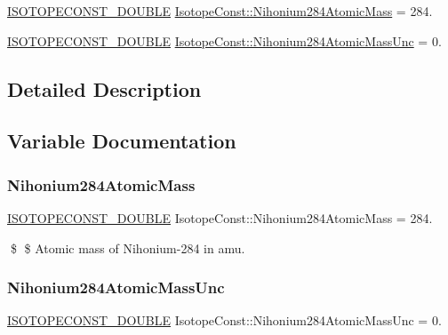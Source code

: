 \begin{DoxyCompactItemize}
\item 
\mbox{\hyperlink{group___isotope_const-_macros_ga8f45a7272ce02c0b4c65c44636ed719a}{I\+S\+O\+T\+O\+P\+E\+C\+O\+N\+S\+T\+\_\+\+D\+O\+U\+B\+LE}} \mbox{\hyperlink{group___isotope_const-_nihonium-_nh284_ga162a0dd06ec54ac38661277358108569}{Isotope\+Const\+::\+Nihonium284\+Atomic\+Mass}} = 284.
\item 
\mbox{\hyperlink{group___isotope_const-_macros_ga8f45a7272ce02c0b4c65c44636ed719a}{I\+S\+O\+T\+O\+P\+E\+C\+O\+N\+S\+T\+\_\+\+D\+O\+U\+B\+LE}} \mbox{\hyperlink{group___isotope_const-_nihonium-_nh284_ga266c70aab092342abc6ea2e861d735f2}{Isotope\+Const\+::\+Nihonium284\+Atomic\+Mass\+Unc}} = 0.
\end{DoxyCompactItemize}


\subsection{Detailed Description}


\subsection{Variable Documentation}
\mbox{\label{group___isotope_const-_nihonium-_nh284_ga162a0dd06ec54ac38661277358108569}} 
\subsubsection{\texorpdfstring{Nihonium284\+Atomic\+Mass}{Nihonium284AtomicMass}}
{\footnotesize\ttfamily \mbox{\hyperlink{group___isotope_const-_macros_ga8f45a7272ce02c0b4c65c44636ed719a}{I\+S\+O\+T\+O\+P\+E\+C\+O\+N\+S\+T\+\_\+\+D\+O\+U\+B\+LE}} Isotope\+Const\+::\+Nihonium284\+Atomic\+Mass = 284.}

\$ \$ Atomic mass of Nihonium-\/284 in amu. \mbox{\label{group___isotope_const-_nihonium-_nh284_ga266c70aab092342abc6ea2e861d735f2}} 
\subsubsection{\texorpdfstring{Nihonium284\+Atomic\+Mass\+Unc}{Nihonium284AtomicMassUnc}}
{\footnotesize\ttfamily \mbox{\hyperlink{group___isotope_const-_macros_ga8f45a7272ce02c0b4c65c44636ed719a}{I\+S\+O\+T\+O\+P\+E\+C\+O\+N\+S\+T\+\_\+\+D\+O\+U\+B\+LE}} Isotope\+Const\+::\+Nihonium284\+Atomic\+Mass\+Unc = 0.}

